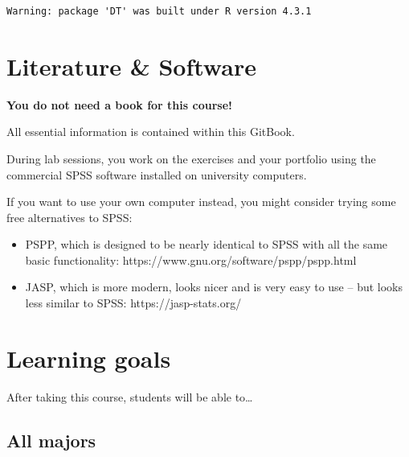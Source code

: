 \documentclass[
  letterpaper,
]{scrbook}
\providecommand{\tightlist}{%
  \setlength{\itemsep}{0pt}\setlength{\parskip}{0pt}}\usepackage{longtable,booktabs,array}
\begin{document}
\begin{verbatim}
Warning: package 'DT' was built under R version 4.3.1
\end{verbatim}

\hypertarget{literature-software}{%
\section*{Literature \& Software}\label{literature-software}}


\textbf{You do not need a book for this course!}

All essential information is contained within this GitBook.

During lab sessions, you work on the exercises and your portfolio using
the commercial SPSS software installed on university computers.

If you want to use your own computer instead, you might consider trying
some free alternatives to SPSS:

\begin{itemize}
\tightlist
\item
  PSPP, which is designed to be nearly identical to SPSS with all the
  same basic functionality: https://www.gnu.org/software/pspp/pspp.html
\item
  JASP, which is more modern, looks nicer and is very easy to use -- but
  looks less similar to SPSS: https://jasp-stats.org/
\end{itemize}

\hypertarget{learning-goals}{%
\section*{Learning goals}\label{learning-goals}}


After taking this course, students will be able to\ldots{}

\hypertarget{all-majors}{%
\subsection*{All majors}\label{all-majors}}
\end{document}
